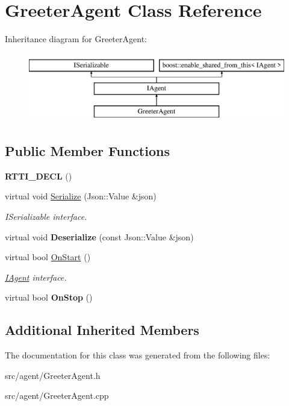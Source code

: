 \hypertarget{class_greeter_agent}{}\section{Greeter\+Agent Class Reference}
\label{class_greeter_agent}
Inheritance diagram for Greeter\+Agent\+:\begin{figure}[H]
\begin{center}
\leavevmode
\includegraphics[height=3.000000cm]{class_greeter_agent}
\end{center}
\end{figure}
\subsection*{Public Member Functions}
\begin{DoxyCompactItemize}
\item 
\mbox{\label{class_greeter_agent_a6464d1152205e913b104b2de842be520}} 
{\bfseries R\+T\+T\+I\+\_\+\+D\+E\+CL} ()
\item 
\mbox{\label{class_greeter_agent_a2d8d405c584c8776ce97d61504756f6f}} 
virtual void \hyperlink{class_greeter_agent_a2d8d405c584c8776ce97d61504756f6f}{Serialize} (Json\+::\+Value \&json)
\begin{DoxyCompactList}\small\item\em I\+Serializable interface. \end{DoxyCompactList}\item 
\mbox{\label{class_greeter_agent_a676ad881a056e796637500a9a2e623a6}} 
virtual void {\bfseries Deserialize} (const Json\+::\+Value \&json)
\item 
\mbox{\label{class_greeter_agent_ad8e9dfab72923acf6027e218158d0cf5}} 
virtual bool \hyperlink{class_greeter_agent_ad8e9dfab72923acf6027e218158d0cf5}{On\+Start} ()
\begin{DoxyCompactList}\small\item\em \hyperlink{class_i_agent}{I\+Agent} interface. \end{DoxyCompactList}\item 
\mbox{\label{class_greeter_agent_a994a77f262194f6bc266f92dd7b9ca51}} 
virtual bool {\bfseries On\+Stop} ()
\end{DoxyCompactItemize}
\subsection*{Additional Inherited Members}


The documentation for this class was generated from the following files\+:\begin{DoxyCompactItemize}
\item 
src/agent/Greeter\+Agent.\+h\item 
src/agent/Greeter\+Agent.\+cpp\end{DoxyCompactItemize}
